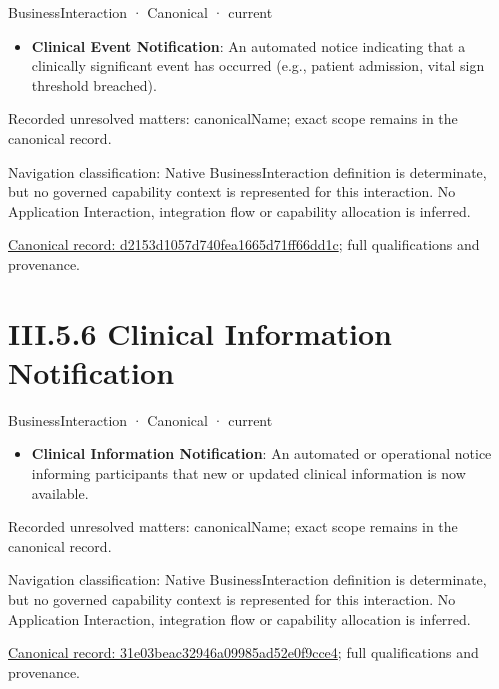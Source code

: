 \label{element:d2153d1057d740fea1665d71ff66dd1c}
{\small BusinessInteraction · Canonical · current}\par

\begin{itemize}


\item \textbf{Clinical Event Notification}: An automated notice indicating that a clinically significant event has occurred (e.g., patient admission, vital sign threshold breached).

\end{itemize}

{\small Recorded unresolved matters: canonicalName; exact scope remains in the canonical record.}\par
{\small Navigation classification: Native BusinessInteraction definition is determinate, but no governed capability context is represented for this interaction. No Application Interaction, integration flow or capability allocation is inferred.}\par
{\footnotesize \href{../../../../../../../../continuum/business/business-interaction/d2153d1057d740fea1665d71ff66dd1c.md}{Canonical record: d2153d1057d740fea1665d71ff66dd1c}; full qualifications and provenance.}\par
\section*{III.5.6 Clinical Information Notification}
\label{navigation:III.5.6}

\label{element:31e03beac32946a09985ad52e0f9cce4}
{\small BusinessInteraction · Canonical · current}\par

\begin{itemize}


\item \textbf{Clinical Information Notification}: An automated or operational notice informing participants that new or updated clinical information is now available.

\end{itemize}

{\small Recorded unresolved matters: canonicalName; exact scope remains in the canonical record.}\par
{\small Navigation classification: Native BusinessInteraction definition is determinate, but no governed capability context is represented for this interaction. No Application Interaction, integration flow or capability allocation is inferred.}\par
{\footnotesize \href{../../../../../../../../continuum/business/business-interaction/31e03beac32946a09985ad52e0f9cce4.md}{Canonical record: 31e03beac32946a09985ad52e0f9cce4}; full qualifications and provenance.}\par
